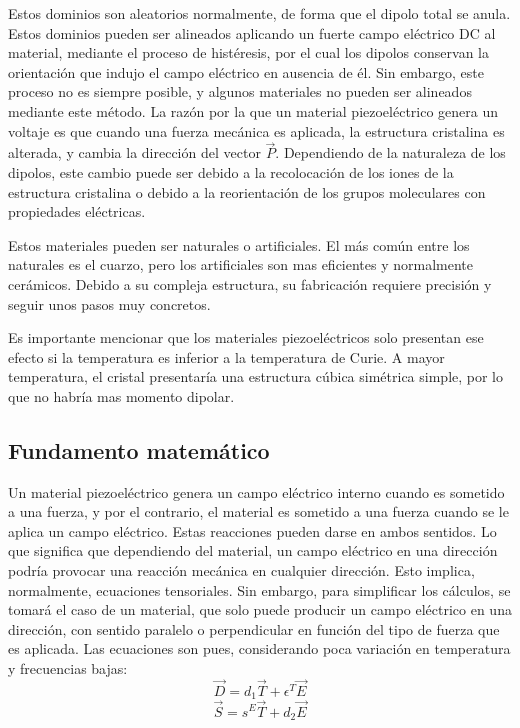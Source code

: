 \documentclass[12pt]{book}
\numberwithin{equation}{section}
\begin{document}
Estos dominios son aleatorios normalmente, de forma que el dipolo total se anula. Estos dominios pueden ser alineados aplicando un fuerte campo eléctrico DC al material, mediante el proceso de histéresis, por el cual los dipolos conservan la orientación que indujo el campo eléctrico en ausencia de él. Sin embargo, este proceso no es siempre posible, y algunos materiales no pueden ser alineados mediante este método. La razón por la que un material piezoeléctrico genera un voltaje es que cuando una fuerza mecánica es aplicada, la estructura cristalina es alterada, y cambia la dirección del vector $\vec{P}$. Dependiendo de la naturaleza de los dipolos, este cambio puede ser debido a la recolocación de los iones de la estructura cristalina o debido a la reorientación de los grupos moleculares con propiedades eléctricas.

Estos materiales pueden ser naturales o artificiales. El más común entre los naturales es el cuarzo, pero los artificiales son mas eficientes y normalmente cerámicos. Debido a su compleja estructura, su fabricación requiere precisión y seguir unos pasos muy concretos.

Es importante mencionar que los materiales piezoeléctricos solo presentan ese efecto si la temperatura es inferior a la temperatura de Curie. A mayor temperatura, el cristal presentaría una estructura cúbica simétrica simple, por lo que no habría mas momento dipolar.

\subsection{Fundamento matemático}

Un material piezoeléctrico genera un campo eléctrico interno cuando es sometido a una fuerza, y por el contrario, el material es sometido a una fuerza cuando se le aplica un campo eléctrico. Estas reacciones pueden darse en ambos sentidos. Lo que significa que dependiendo del material, un campo eléctrico en una dirección podría provocar una reacción mecánica en cualquier dirección. Esto implica, normalmente, ecuaciones tensoriales. Sin embargo, para simplificar los cálculos, se tomará el caso de un material, que solo puede producir un campo eléctrico en una dirección, con sentido paralelo o perpendicular en función del tipo de fuerza que es aplicada. Las ecuaciones son pues, considerando poca variación en temperatura y frecuencias bajas:
\begin{equation}
\vec{D} = d_1 \vec{T} + \epsilon ^T \vec{E}
\end{equation}
\begin{equation}
\vec{S} = s^E \vec{T} + d_2 \vec{E}
\end{equation}
\end{document}
